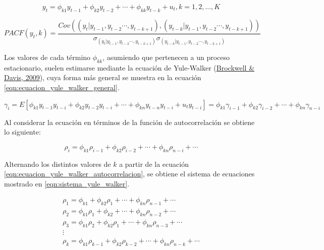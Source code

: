 \documentclass[
]{article}
\begin{document}
\begin{equation}
\label{eqn:ecuacion_autocorrelaciones}
y_t=\phi_{k1}y_{t-1}+\phi_{k2}y_{t-2}+\cdots+\phi_{kk}y_{t-k}+u_t,k=1,2,...,K
\end{equation}

\begin{equation}
\label{eqn:ecuacion_PACF}
PACF(y_t,k)=\frac{Cov\left(\left(y_t|y_{t-1},y_{t-2}\cdots,y_{t-k+1}\right),\left(y_{t-k}|y_{t-1},y_{t-2}\cdots,y_{t-k+1}\right)\right)}{\sigma_{\left(y_t|y_{t-1},y_{t-2}\cdots,y_{t-k+1}\right)}\sigma_{\left(y_{t-k}|y_{t-1},y_{t-2}\cdots,y_{t-k+1}\right)}}
\end{equation}

Los valores de cada término \(\phi_{kk}\), asumiendo que pertenecen a un
proceso estacionario, suelen estimarse mediante la ecuación de
Yule-Walker (\protect\hyperlink{ref-yule.walker}{Brockwell \& Davis,
2009}), cuya forma más general se muestra en la ecuación
\eqref{eqn:ecuacion_yule_walker_general}.

\begin{equation}
\label{eqn:ecuacion_yule_walker_general}
\gamma_i=E\left[ \phi_{k1}y_{t-1}y_{t-i} + \phi_{k2}y_{t-2}y_{t-i} + \cdots + \phi_{kn}y_{t-n}y_{t-i} + u_ty_{t-i} \right]=\phi_{k1}\gamma_{i-1} + \phi_{k2}\gamma_{i-2} + \cdots + \phi_{kn}\gamma_{n-i}
\end{equation}

Al considerar la ecuación en términos de la función de autocorrelación
se obtiene lo siguiente:

\begin{equation}
\label{eqn:ecuacion_yule_walker_autocorrelacion}
\rho_i=\phi_{k1}\rho_{i-1} + \phi_{k2}\rho_{i-2} + \cdots + \phi_{kn}\rho_{n-i}+\cdots
\end{equation}

Alternando los distintos valores de \(k\) a partir de la ecuación
\eqref{eqn:ecuacion_yule_walker_autocorrelacion}, se obtiene el sistema
de ecuaciones mostrado en \eqref{eqn:sistema_yule_walker}.

\begin{equation}
\label{eqn:sistema_yule_walker}
\begin{array}{lll} 
\rho_1=\phi_{k1} + \phi_{k2}\rho_{1} + \cdots + \phi_{kn}\rho_{n-1}+\cdots \\
\rho_2=\phi_{k1}\rho_{1} + \phi_{k2} + \cdots + \phi_{kn}\rho_{n-2}+\cdots \\
\rho_3=\phi_{k1}\rho_{2} + \phi_{k2}\rho_{1} + \cdots + \phi_{kn}\rho_{n-3}+\cdots \\
\vdots \\
\rho_k=\phi_{k1}\rho_{k-1} + \phi_{k2}\rho_{k-2} + \cdots + \phi_{kn}\rho_{n-k}+\cdots
\end{array}
\end{equation}
\end{document}

